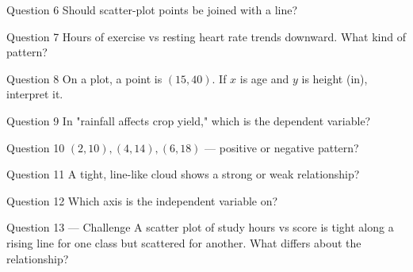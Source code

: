 \documentclass[11pt]{article}
\begin{document}
\begin{qbox}{Question 6}
Should scatter-plot points be joined with a line?\workspace{2.4cm}
\end{qbox}

\begin{qbox}{Question 7}
Hours of exercise vs resting heart rate trends downward. What kind of pattern?\workspace{2.4cm}
\end{qbox}

\begin{qbox}{Question 8}
On a plot, a point is $(15, 40)$. If $x$ is age and $y$ is height (in), interpret it.\workspace{2.4cm}
\end{qbox}

\begin{qbox}{Question 9}
In "rainfall affects crop yield," which is the dependent variable?\workspace{2.4cm}
\end{qbox}

\begin{qbox}{Question 10}
$(2,10),(4,14),(6,18)$ — positive or negative pattern?\workspace{2.4cm}
\end{qbox}

\begin{qbox}{Question 11}
A tight, line-like cloud shows a strong or weak relationship?\workspace{2.4cm}
\end{qbox}

\begin{qbox}{Question 12}
Which axis is the independent variable on?\workspace{2.4cm}
\end{qbox}

\begin{qbox}{Question 13 --- Challenge}
A scatter plot of study hours vs score is tight along a rising line for one class but scattered for another. What differs about the relationship?\workspace{3cm}
\end{qbox}

\clearpage
{}
\end{document}
